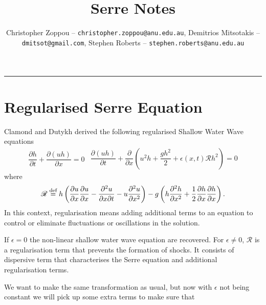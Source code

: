 \documentclass[10pt]{article}
\title{Serre Notes}
\author{Christopher Zoppou -- \texttt{christopher.zoppou@anu.edu.au}, Demitrios Mitsotakis -- \texttt{dmitsot@gmail.com}, Stephen Roberts -- \texttt{stephen.roberts@anu.edu.au}}
\newcommand{\defn}{\stackrel{\textrm{\scriptsize def}}{=}}
\begin{document}
\maketitle

\vspace{-0.3in}
\noindent
\rule{\linewidth}{0.4pt}



\section{Regularised Serre Equation}

Clamond and Dutykh\cite{Clamond-Dutykh-2018-237} derived the following regularised Shallow Water Wave equations 
\begin{subequations}
\begin{gather}
\dfrac{\partial h}{\partial t} + \dfrac{\partial (uh)}{\partial x} = 0
\label{eq:gSVa}
\end{gather}
\begin{gather}
\dfrac{\partial (uh)}{\partial t} + \dfrac{\partial }{\partial x} \left( u^2h + \dfrac{gh^2}{2} + \epsilon(x,t) \mathscr{R}h^2 \right)= 0
\label{eq:gSVb}
\end{gather}
\label{eq:gSV}
\end{subequations}
where
\begin{gather*}
\mathscr{R} \defn h \left ( \dfrac{\partial u}{\partial x} \dfrac{\partial u}{\partial x}  - \dfrac{\partial^2 u}{\partial x \partial t} - u \dfrac{\partial^2 u}{\partial x^2} \right ) - g \left ( h \dfrac{\partial^2 h}{\partial x^2}  + \dfrac{1}{2} \dfrac{\partial h}{\partial x} \dfrac{\partial h}{\partial x} \right ).
\end{gather*}
In this context, regularisation means adding additional terms to an equation to control or eliminate fluctuations or oscillations in the solution.

If $\epsilon = 0$ the non-linear shallow water wave equation are recovered. For $\epsilon \ne 0$, $\mathscr{R}$ is a regularisation term that prevents the formation of shocks. It consists of dispersive term that characterises the Serre equation and additional regularisation terms.


We want to make the same transformation as usual, but now with $\epsilon$ not being constant we will pick up some extra terms to make sure that
\end{document}
